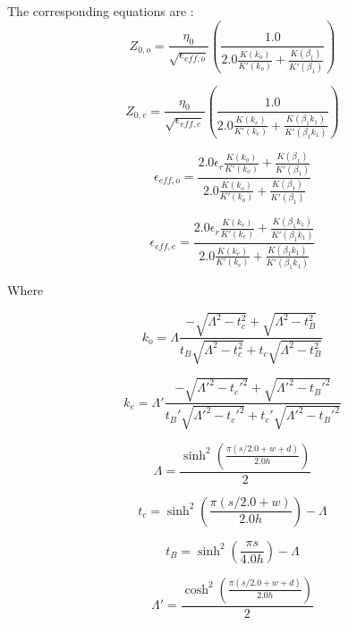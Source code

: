 The corresponding equations are \cite[~p197-198]{wadell}: 
\begin{equation}
	Z_{0,o} = \frac{\eta_0}{\sqrt{\epsilon_{eff,o}}} \left( \frac{1.0}{2.0 \frac{K(k_o)}{K'(k_o)} + \frac{K(\beta_1)}{K'(\beta_1)}}\right)
\end{equation}    

\begin{equation}
	Z_{0,e} = \frac{\eta_0}{\sqrt{\epsilon_{eff,e}}} \left( \frac{1.0}{2.0 \frac{K(k_e)}{K'(k_e)} + \frac{K(\beta_1 k_1)}{K'(\beta_1 k_1)}}\right)
\end{equation} 


\begin{equation}
	\epsilon_{eff,o} = \frac{2.0 \epsilon_r \frac{K(k_o)}{K'(k_o)} + \frac{K(\beta_1)}{K'(\beta_1)}}{2.0 \frac{K(k_o)}{K'(k_o)} + \frac{K(\beta_1)}{K'(\beta_1)}}
\end{equation}

\begin{equation}
	\epsilon_{eff,e} = \frac{2.0 \epsilon_r \frac{K(k_e)}{K'(k_e)} + \frac{K(\beta_1 k_1)}{K'(\beta_1 k_1)}}{2.0 \frac{K(k_e)}{K'(k_e)} + \frac{K(\beta_1 k_1)}{K'(\beta_1 k_1)}}
\end{equation}

Where

\begin{equation}
	k_o = \Lambda \frac{-\sqrt{\Lambda^2 - t_c^2} + \sqrt{\Lambda^2 - t_B^2}}{t_B\sqrt{\Lambda^2 - t_c^2} + t_c \sqrt{\Lambda^2 - t_B^2}}
\end{equation}

\begin{equation}
	k_e = \Lambda' \frac{-\sqrt{\Lambda'^2 - t_c'^2} + \sqrt{\Lambda'^2 - t_B'^2}}{t_B'\sqrt{\Lambda'^2 - t_c'^2} + t_c' \sqrt{\Lambda'^2 - t_B'^2}}
\end{equation}


\begin{equation}
	\Lambda = \frac{\sinh^2 \left( \frac{\pi (s/2.0 + w + d)}{2.0 h} \right) }{2}
\end{equation}

\begin{equation}
	t_c = \sinh^2 \left( \frac{\pi (s/2.0 + w)}{2.0 h} \right) - \Lambda
\end{equation}

\begin{equation}
	t_B = \sinh^2 \left( \frac{\pi s}{4.0 h} \right) - \Lambda
\end{equation}


\begin{equation}
	\Lambda' = \frac{\cosh^2 \left( \frac{\pi (s/2.0 + w + d)}{2.0 h} \right) }{2}
\end{equation}

